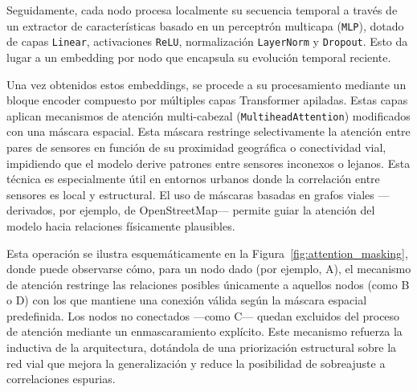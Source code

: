 Seguidamente, cada nodo procesa localmente su secuencia temporal a través de un extractor de características basado en un perceptrón multicapa (\texttt{MLP}), dotado de capas \texttt{Linear}, activaciones \texttt{ReLU}, normalización \texttt{LayerNorm} y \texttt{Dropout}. Esto da lugar a un embedding por nodo que encapsula su evolución temporal reciente.

Una vez obtenidos estos embeddings, se procede a su procesamiento mediante un bloque encoder compuesto por múltiples capas Transformer apiladas. Estas capas aplican mecanismos de atención multi-cabezal (\texttt{MultiheadAttention}) modificados con una máscara espacial. Esta máscara restringe selectivamente la atención entre pares de sensores en función de su proximidad geográfica o conectividad vial, impidiendo que el modelo derive patrones entre sensores inconexos o lejanos. Esta técnica es especialmente útil en entornos urbanos donde la correlación entre sensores es local y estructural. El uso de máscaras basadas en grafos viales —derivados, por ejemplo, de OpenStreetMap— permite guiar la atención del modelo hacia relaciones físicamente plausibles.

Esta operación se ilustra esquemáticamente en la Figura~\ref{fig:attention_masking}, donde puede observarse cómo, para un nodo dado (por ejemplo, A), el mecanismo de atención restringe las relaciones posibles únicamente a aquellos nodos (como B o D) con los que mantiene una conexión válida según la máscara espacial predefinida. Los nodos no conectados —como C— quedan excluidos del proceso de atención mediante un enmascaramiento explícito. Este mecanismo refuerza la inductiva de la arquitectura, dotándola de una priorización estructural sobre la red vial que mejora la generalización y reduce la posibilidad de sobreajuste a correlaciones espurias.

